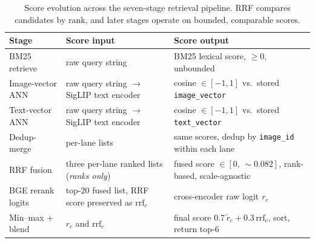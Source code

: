 \begin{table}[H]
\centering
\small
\begin{tabular}{p{2.6cm}p{4.0cm}p{5.4cm}}
\toprule
\textbf{Stage} & \textbf{Score input} & \textbf{Score output}\\
\midrule
BM25 retrieve         & raw query string                                          & BM25 lexical score, $\geq 0$, unbounded \\
Image-vector ANN      & raw query string $\to$ SigLIP text encoder                & cosine $\in [-1,1]$ vs.\ stored \texttt{image\_vector} \\
Text-vector ANN       & raw query string $\to$ SigLIP text encoder                & cosine $\in [-1,1]$ vs.\ stored \texttt{text\_vector} \\
Dedup-merge           & per-lane lists                                            & same scores, dedup by \texttt{image\_id} within each lane \\
RRF fusion            & three per-lane ranked lists (\emph{ranks only})           & fused score $\in [0,\,\sim 0.082]$, rank-based, scale-agnostic \\
BGE rerank logits     & top-20 fused list, RRF score preserved as $\text{rrf}_c$  & cross-encoder raw logit $r_c$ \\
Min--max + blend      & $r_c$ and $\text{rrf}_c$                                  & final score $0.7\,\tilde r_c + 0.3\,\text{rrf}_c$, sort, return top-6 \\
\bottomrule
\end{tabular}
\caption{Score evolution across the seven-stage retrieval pipeline. RRF compares candidates by rank, and later stages operate on bounded, comparable scores.}

\label{tab:score_evolution}
\end{table}

